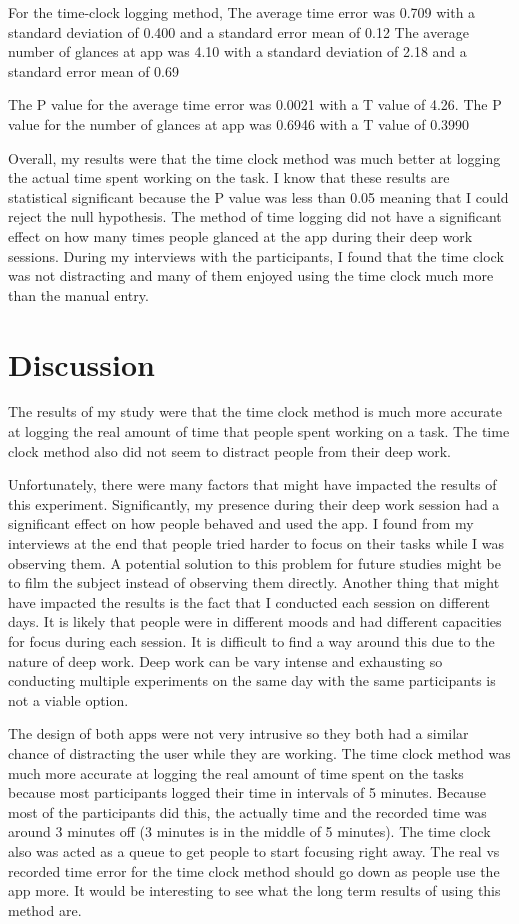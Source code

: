 \documentclass[sigconf]{acmart}
\begin{document}
For the time-clock logging method, 
    The average time error was 0.709 with a standard deviation of 0.400 and a standard error mean of 0.12
    The average number of glances at app was 4.10 with a standard deviation of 2.18 and a standard error mean of 0.69

The P value for the average time error was 0.0021 with a T value of 4.26. 
The P value for the number of glances at app was 0.6946 with a T value of 0.3990

Overall, my results were that the time clock method was much better at logging the actual time spent working on the task. I know that these results are statistical significant because the P value was less than 0.05 meaning that I could reject the null hypothesis. The method of time logging did not have a significant effect on how many times people glanced at the app during their deep work sessions. During my interviews with the participants, I found that the time clock was not distracting and many of them enjoyed using the time clock much more than the manual entry.

\section{Discussion}
The results of my study were that the time clock method is much more accurate at logging the real amount of time that people spent working on a task. The time clock method also did not seem to distract people from their deep work.

Unfortunately, there were many factors that might have impacted the results of this experiment. Significantly, my presence during their deep work session had a significant effect on how people behaved and used the app. I found from my interviews at the end that people tried harder to focus on their tasks while I was observing them. A potential solution to this problem for future studies might be to film the subject instead of observing them directly. Another thing that might have impacted the results is the fact that I conducted each session on different days. It is likely that people were in different moods and had different capacities for focus during each session. It is difficult to find a way around this due to the nature of deep work. Deep work can be vary intense and exhausting so conducting multiple experiments on the same day with the same participants is not a viable option. 

The design of both apps were not very intrusive so they both had a similar chance of distracting the user while they are working. The time clock method was much more accurate at logging the real amount of time spent on the tasks because most participants logged their time in intervals of 5 minutes. Because most of the participants did this, the actually time and the recorded time was around 3 minutes off (3 minutes is in the middle of 5 minutes). The time clock also was acted as a queue to get people to start focusing right away. The real vs recorded time error for the time clock method should go down as people use the app more. It would be interesting to see what the long term results of using this method are. 
\end{document}
